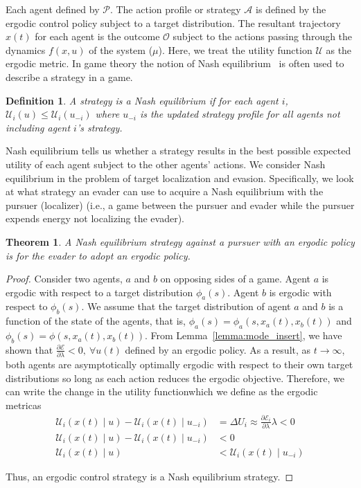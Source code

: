 \documentclass[letterpaper, 10 pt, conference]{ieeeconf}  %
\newtheorem{theorem}{Theorem}
\newtheorem{definition}{Definition}
\begin{document}
Each agent defined by $\mathcal{P}$.
The action profile or strategy $\mathcal{A}$ is defined by the ergodic control policy subject to a target distribution.
The resultant trajectory $x(t)$ for each agent is the outcome $\mathcal{O}$ subject to the actions passing through the dynamics $f(x,u)$ of the system ($\mu$).
Here, we treat the utility function $\mathcal{U}$ as the ergodic metric.
In game theory the notion of Nash equilibrium~\cite{bhattacharya2009existence, myerson1978refinements} is often used to describe a strategy in a game.
\begin{definition}
A strategy is a Nash equilibrium if for each agent $i$, $\mathcal{U}_i(u) \le \mathcal{U}_i( u_{-i})$ where $u_{ -i}$ is the updated strategy profile for all agents not including agent $i$'s strategy.
\end{definition}

Nash equilibrium tells us whether a strategy results in the best possible expected utility of each agent subject to the other agents' actions.
We consider Nash equilibrium in the problem of target localization and evasion.
Specifically, we look at what strategy an evader can use to acquire a Nash equilibrium with the pursuer (localizer) (i.e., a game between the pursuer and evader while the pursuer expends energy not localizing the evader).
\begin{theorem}
A Nash equilibrium strategy against a pursuer with an ergodic policy is for the evader to adopt an ergodic policy.
\end{theorem}
\begin{proof}
Consider two agents, $a$ and $b$ on opposing sides of a game.
Agent $a$ is ergodic with respect to a target distribution $\phi_a(s)$. 
Agent $b$ is ergodic with respect to $\phi_b(s)$.
We assume that the target distribution of agent $a$ and $b$ is a function of the state of the agents, that is, $\phi_a(s) = \phi_a(s, x_a(t), x_b(t))$ and  $\phi_b(s) = \phi(s, x_a(t), x_b(t))$.
From Lemma~\ref{lemma:mode_insert}, we have shown that $\frac{\partial \mathcal{E}}{\partial \lambda} < 0 ,\ \forall u(t)$ defined by an ergodic policy.
As a result,  as $t \to \infty$, both agents are asymptotically optimally ergodic with respect to their own target distributions so long as each action reduces the ergodic objective.
Therefore, we can write the change in the utility function\textemdash which we define as the ergodic metric\textemdash as
\begin{align*}
\mathcal{U}_i(x(t) \mid u) - \mathcal{U}_i(x(t) \mid u_{-i} ) & = \Delta U_i  \approx \frac{\partial \mathcal{E}_i}{\partial \lambda} \lambda < 0 \\
\mathcal{U}_i(x(t) \mid u) - \mathcal{U}_i(x(t) \mid u_{-i} )  & < 0 \\
\mathcal{U}_i(x(t) \mid u) &< \mathcal{U}_i(x(t) \mid u_{-i} )
\end{align*}

Thus, an ergodic control strategy is a Nash equilibrium strategy.
\end{proof}
\end{document}
